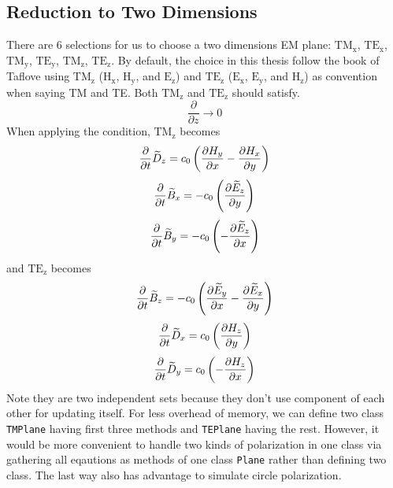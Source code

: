 \subsection{Reduction to Two Dimensions}
There are 6 selections for us to choose a two dimensions EM plane: $\mathrm{TM_{x}} $, $\mathrm{TE_{x}}$,
$\mathrm{TM_{y}}$, $\mathrm{TE_{y}}$, $\mathrm{TM_{z}}$, $\mathrm{TE_{z}}$. By default, the choice in this thesis follow
the book of Taflove using $\mathrm{TM_{z}}$ ($\mathrm{H_x}$, $\mathrm{H_y}$, and $\mathrm{E_z}$) and $\mathrm{TE_{z}}$
($\mathrm{E_x}$, $\mathrm{E_y}$, and $\mathrm{H_z}$) as convention when saying TM and TE. Both $\mathrm{TM_z}$ and
$\mathrm{TE_z}$ should satisfy.
\begin{displaymath}
  \frac{\partial}{\partial z} \rightarrow 0
\end{displaymath}
When applying the condition, $\mathrm{TM_z}$ becomes
\begin{displaymath}
  \frac{\partial}{\partial t}\widetilde{D}_z = c_0 \left( \frac{\partial H_y}{\partial x} - \frac{\partial H_x}{\partial y}\right)
\end{displaymath}
\begin{displaymath}
  \frac{\partial}{\partial t}\widetilde{B}_x =-c_0 \left( \frac{\partial \widetilde{E}_z}{\partial y}\right)
\end{displaymath}
\begin{displaymath}
  \frac{\partial}{\partial t}\widetilde{B}_y =-c_0 \left(- \frac{\partial \widetilde{E}_z}{\partial x}\right)
\end{displaymath}
and $\mathrm{TE_z}$ becomes
\begin{displaymath}
    \frac{\partial}{\partial t}\widetilde{B}_z =-c_0 \left( \frac{\partial \widetilde{E}_y}{\partial x} - \frac{\partial \widetilde{E}_x}{\partial y}\right)
\end{displaymath}
\begin{displaymath}
  \frac{\partial}{\partial t}\widetilde{D}_x = c_0 \left( \frac{\partial H_z}{\partial y}\right)
\end{displaymath}
\begin{displaymath}
  \frac{\partial}{\partial t}\widetilde{D}_y = c_0 \left(- \frac{\partial H_z}{\partial x}\right)
\end{displaymath}
Note they are two independent sets because they don't use component of each other for updating itself. For less overhead
of memory, we can define two class \texttt{TMPlane} having first three methods and \texttt{TEPlane} having the
rest. However, it would be more convenient to handle two kinds of polarization in one class via gathering all eqautions
as methods of one class \texttt{Plane} rather than defining two class. The last way also has advantage to simulate
circle polarization.

